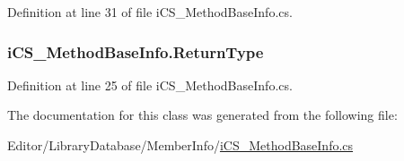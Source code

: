 Definition at line 31 of file i\+C\+S\+\_\+\+Method\+Base\+Info.\+cs.

\hypertarget{classi_c_s___method_base_info_a36e087cac5bad196cd40fa640c8f0889}{
\subsubsection[{Return\+Type}]{ i\+C\+S\+\_\+\+Method\+Base\+Info.\+Return\+Type\hspace{0.3cm}{\ttfamily [get]}}}\label{classi_c_s___method_base_info_a36e087cac5bad196cd40fa640c8f0889}


Definition at line 25 of file i\+C\+S\+\_\+\+Method\+Base\+Info.\+cs.



The documentation for this class was generated from the following file\+:\begin{DoxyCompactItemize}
\item 
Editor/\+Library\+Database/\+Member\+Info/\hyperlink{i_c_s___method_base_info_8cs}{i\+C\+S\+\_\+\+Method\+Base\+Info.\+cs}\end{DoxyCompactItemize}
